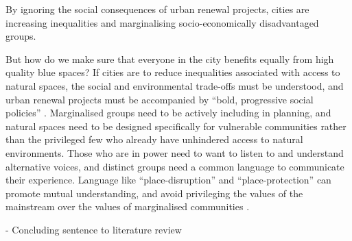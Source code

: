 \documentclass{article}
\begin{document}
By ignoring the social consequences of urban renewal projects, cities are increasing inequalities and marginalising socio-economically disadvantaged groups. 


But how do we make sure that everyone in the city benefits equally from high quality blue spaces?
If cities are to reduce inequalities associated with access to natural spaces, the social and environmental trade-offs must be understood, and urban renewal projects must be accompanied by ``bold, progressive social policies'' \parencite{anguelovski2021green}. Marginalised groups need to be actively including in planning, and natural spaces need to be designed specifically for vulnerable communities rather than the privileged few who already have unhindered access to natural environments.
Those who are in power need to want to listen to and understand alternative voices, and distinct groups need a common language to communicate their experience. Language like ``place-disruption'' and ``place-protection'' can promote mutual understanding, and avoid privileging the values of the mainstream over the values of marginalised communities \parencite{toomey2021place}.


- Concluding sentence to literature review


\begin{comment}
- Importance of situating ??
- Right to the city enabled through public blue space (in connection to recognition justice)
	1. Public blue spaces are a shared, common good, that everyone should be able to acces \parencite{wessells2014urban}	
	2. cite more general right to the city literature
	3. Sharing the benefits that waterfronts have on people and the environment
- individuals and communities are inextricably linked to place, and disrupting place/not providing it threatens their existence / belonging
\end{comment}
\end{document}
